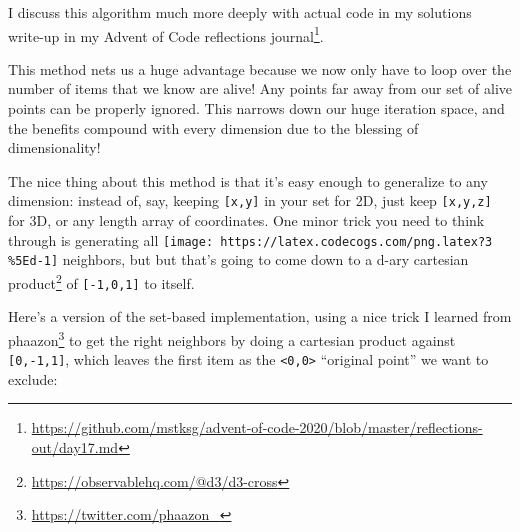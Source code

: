 \documentclass[]{article}
\renewcommand{\href}[2]{#2\footnote{\url{#1}}}
\begin{document}
I discuss this algorithm much more deeply with actual code in
\href{https://github.com/mstksg/advent-of-code-2020/blob/master/reflections-out/day17.md}{my
solutions write-up in my Advent of Code reflections journal}.

This method nets us a huge advantage because we now only have to loop over the
number of items that we know are alive! Any points far away from our set of
alive points can be properly ignored. This narrows down our huge iteration
space, and the benefits compound with every dimension due to the blessing of
dimensionality!

The nice thing about this method is that it's easy enough to generalize to any
dimension: instead of, say, keeping \texttt{{[}x,y{]}} in your set for 2D, just
keep \texttt{{[}x,y,z{]}} for 3D, or any length array of coordinates. One minor
trick you need to think through is generating all
\texttt{[image: https://latex.codecogs.com/png.latex?3\\\%5Ed-1]} neighbors, but
but that's going to come down to a d-ary
\href{https://observablehq.com/@d3/d3-cross}{cartesian product} of
\texttt{{[}-1,0,1{]}} to itself.

Here's a version of the set-based implementation, using a nice trick I learned
from \href{https://twitter.com/phaazon_}{phaazon} to get the right neighbors by
doing a cartesian product against \texttt{{[}0,-1,1{]}}, which leaves the first
item as the \texttt{\textless{}0,0\textgreater{}} ``original point'' we want to
exclude:
\end{document}
